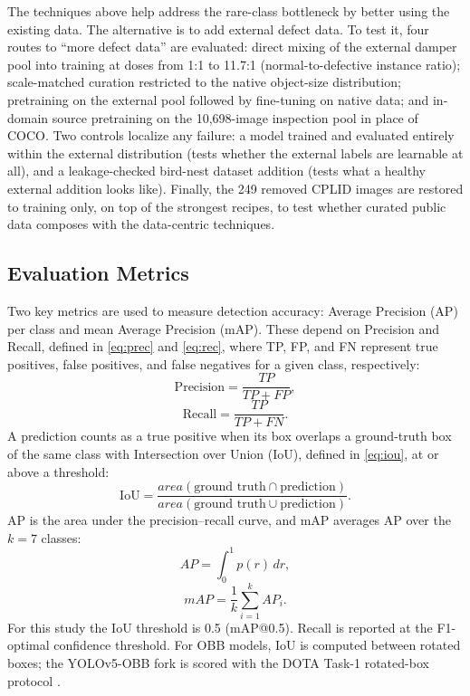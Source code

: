 \documentclass[conference]{IEEEtran}
\makeatletter
\newcommand{\map}{mAP@0.5}
\makeatother
\begin{document}
The techniques above help address the rare-class bottleneck by better using the existing data. The alternative is to add external defect data. To test it, four routes to ``more defect data'' are evaluated: direct mixing of the external damper pool into training at doses from 1:1 to 11.7:1 (normal-to-defective instance ratio); scale-matched curation restricted to the native object-size distribution; pretraining on the external pool followed by fine-tuning on native data; and in-domain source pretraining on the 10{,}698-image inspection pool in place of COCO. Two controls localize any failure: a model trained and evaluated entirely within the external distribution (tests whether the external labels are learnable at all), and a leakage-checked bird-nest dataset addition (tests what a healthy external addition looks like). Finally, the 249 removed CPLID images are restored to training only, on top of the strongest recipes, to test whether curated public data composes with the data-centric techniques.

\subsection{Evaluation Metrics}
\label{sec:metrics}
Two key metrics are used to measure detection accuracy: Average Precision (AP) per class and mean Average Precision (mAP). These depend on Precision and Recall, defined in \eqref{eq:prec} and \eqref{eq:rec}, where TP, FP, and FN represent true positives, false positives, and false negatives for a given class, respectively:
\begin{equation}
\label{eq:prec}
\text{Precision} = \frac{TP}{TP + FP},
\end{equation}
\begin{equation}
\label{eq:rec}
\text{Recall} = \frac{TP}{TP + FN}.
\end{equation}
A prediction counts as a true positive when its box overlaps a ground-truth box of the same class with Intersection over Union (IoU), defined in \eqref{eq:iou}, at or above a threshold:
\begin{equation}
\label{eq:iou}
\text{IoU} = \frac{\mathit{area}(\text{ground truth} \cap \text{prediction})}{\mathit{area}(\text{ground truth} \cup \text{prediction})}.
\end{equation}
AP is the area under the precision--recall curve, and mAP averages AP over the $k{=}7$ classes:
\begin{equation}
\label{eq:ap}
AP = \int_0^1 p(r)\,dr,
\end{equation}
\begin{equation}
\label{eq:map}
mAP = \frac{1}{k}\sum_{i=1}^{k} AP_i.
\end{equation}
For this study the IoU threshold is 0.5 (\map{}). Recall is reported at the F1-optimal confidence threshold. For OBB models, IoU is computed between rotated boxes; the YOLOv5-OBB fork is scored with the DOTA Task-1 rotated-box protocol \cite{xia2018dota}.
\end{document}
